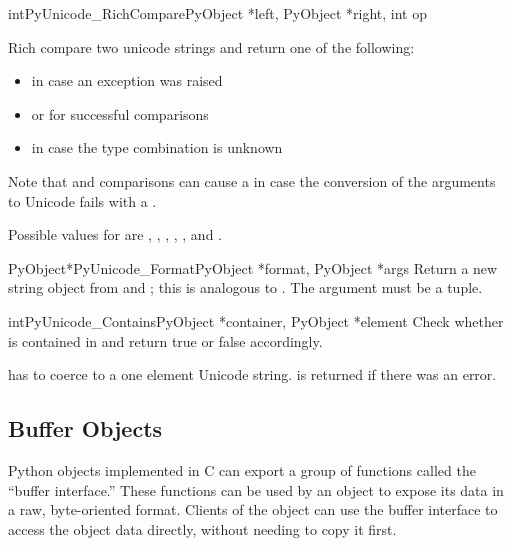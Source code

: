\begin{cfuncdesc}{int}{PyUnicode_RichCompare}{PyObject *left, 
                                              PyObject *right, 
                                              int op}

  Rich compare two unicode strings and return one of the following:
  \begin{itemize}
    \item {} in case an exception was raised
    \item {} or  for successful comparisons
    \item {} in case the type combination is unknown
  \end{itemize}

   Note that  and  comparisons can cause a
    in case the conversion of the arguments to
   Unicode fails with a .

   Possible values for  are
   , , ,
   , , and .
\end{cfuncdesc}

\begin{cfuncdesc}{PyObject*}{PyUnicode_Format}{PyObject *format,
                                              PyObject *args}
  Return a new string object from  and ; this
  is analogous to .  The
   argument must be a tuple.
\end{cfuncdesc}

\begin{cfuncdesc}{int}{PyUnicode_Contains}{PyObject *container,
                                           PyObject *element}
  Check whether  is contained in  and
  return true or false accordingly.

   has to coerce to a one element Unicode
  string.  is returned if there was an error.
\end{cfuncdesc}


\subsection{Buffer Objects \label{bufferObjects}}

Python objects implemented in C can export a group of functions called
the ``buffer interface.''  These functions can
be used by an object to expose its data in a raw, byte-oriented
format. Clients of the object can use the buffer interface to access
the object data directly, without needing to copy it first.

